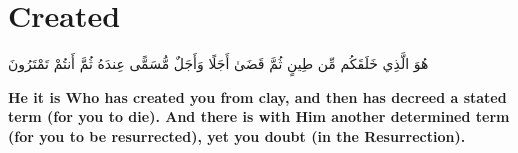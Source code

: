 \chapter{Created}
\begin{center}
    {\Huge    
        \begin{Arabic}
            هُوَ الَّذِي خَلَقَكُم مِّن طِينٍ ثُمَّ قَضَىٰ أَجَلًا وَأَجَلٌ مُّسَمًّى عِندَهُ ثُمَّ أَنتُمْ تَمْتَرُونَ
        \end{Arabic}
    }    
\end{center}
\vspace*{\fill}
\vspace{3cm}
\begin{center}
    \Large \textbf{He it is Who has created you from clay, and then has decreed a stated term (for you to die). And there is with Him another determined term (for you to be resurrected), yet you doubt (in the Resurrection).}
\end{center}
